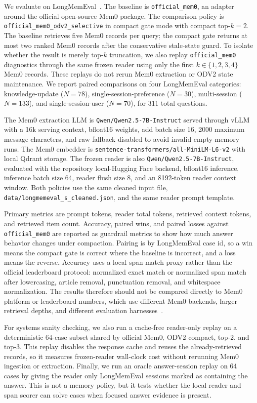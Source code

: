 \documentclass{article}
\begin{document}
We evaluate on LongMemEval~\cite{wu2025longmemeval}. The baseline is \texttt{official\_mem0}, an adapter around the official open-source Mem0 package. The comparison policy is \texttt{official\_mem0\_odv2\_selective} in compact gate mode with compact top-$k=2$. The baseline retrieves five Mem0 records per query; the compact gate returns at most two ranked Mem0 records after the conservative stale-state guard. To isolate whether the result is merely top-$k$ truncation, we also replay \texttt{official\_mem0} diagnostics through the same frozen reader using only the first $k \in \{1,2,3,4\}$ Mem0 records. These replays do not rerun Mem0 extraction or ODV2 state maintenance. We report paired comparisons on four LongMemEval categories: knowledge-update ($N=78$), single-session-preference ($N=30$), multi-session ($N=133$), and single-session-user ($N=70$), for 311 total questions.

The Mem0 extraction LLM is \texttt{Qwen/Qwen2.5-7B-Instruct} served through vLLM with a 16k serving context, bfloat16 weights, add batch size 16, 2000 maximum message characters, and raw fallback disabled to avoid invalid empty-memory runs. The Mem0 embedder is \texttt{sentence-transformers/all-MiniLM-L6-v2} with local Qdrant storage. The frozen reader is also \texttt{Qwen/Qwen2.5-7B-Instruct}, evaluated with the repository local-Hugging Face backend, bfloat16 inference, inference batch size 64, reader flush size 8, and an 8192-token reader context window. Both policies use the same cleaned input file, \texttt{data/longmemeval\_s\_cleaned.json}, and the same reader prompt template.

Primary metrics are prompt tokens, reader total tokens, retrieved context tokens, and retrieved item count. Accuracy, paired wins, and paired losses against \texttt{official\_mem0} are reported as guardrail metrics to show how much answer behavior changes under compaction. Pairing is by LongMemEval case id, so a win means the compact gate is correct where the baseline is incorrect, and a loss means the reverse. Accuracy uses a local span-match proxy rather than the official leaderboard protocol: normalized exact match or normalized span match after lowercasing, article removal, punctuation removal, and whitespace normalization. The results therefore should not be compared directly to Mem0 platform or leaderboard numbers, which use different Mem0 backends, larger retrieval depths, and different evaluation harnesses~\cite{mem0benchmarks2026}.

For systems sanity checking, we also run a cache-free reader-only replay on a deterministic 64-case subset shared by official Mem0, ODV2 compact, top-2, and top-3. This replay disables the response cache and reuses the already-retrieved records, so it measures frozen-reader wall-clock cost without rerunning Mem0 ingestion or extraction. Finally, we run an oracle answer-session replay on 64 cases by giving the reader only LongMemEval sessions marked as containing the answer. This is not a memory policy, but it tests whether the local reader and span scorer can solve cases when focused answer evidence is present.
\end{document}
